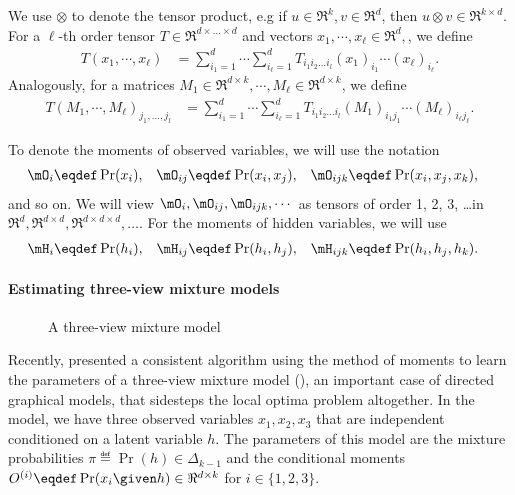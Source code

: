 We use $\otimes$ to denote the tensor product, e.g if $u \in \Re^k,
  v \in \Re^d$, then $u \otimes v \in \Re^{k \times d}$.
For a $\ell$-th order tensor $T \in \Re^{d \times \ldots \times
  d}$ and vectors $x_1, \cdots, x_\ell \in \Re^{d},$, we define 
\begin{align*}
  T(x_1, \cdots, x_\ell) 
      &= \sum_{i_1 = 1}^{d} \cdots \sum_{i_\ell = 1}^{d} 
            T_{i_1 i_2 \ldots i_l} ({x_1})_{i_1} \cdots ({x_\ell})_{i_\ell}.
\end{align*}
Analogously, for a matrices $M_1 \in \Re^{d \times k}, \cdots,
  M_\ell \in \Re^{d \times k}$, we define
\begin{align*}
  T(M_1, \cdots, M_\ell)_{j_1, \ldots, j_l} 
      &= \sum_{i_1 = 1}^{d} \cdots \sum_{i_\ell = 1}^{d} 
            T_{i_1 i_2 \ldots i_l} ({M_1})_{i_1j_1} \cdots ({M_\ell})_{i_\ell j_\ell}.
\end{align*}

To denote the moments of observed variables, we will use the notation
\begin{align*}
  \mO_i &\eqdef \Pr(x_i), &
  \mO_{ij} &\eqdef \Pr(x_i, x_j), &
  \mO_{ijk} &\eqdef \Pr(x_i, x_j, x_k),
\end{align*}
and so on.
We will view $\mO_i, \mO_{ij}, \mO_{ijk}, \cdots$ as tensors of
  order 1, 2, 3, \ldots in $\Re^d, \Re^{d\times d}, \Re^{d \times
  d \times d},\ldots$.
For the moments of hidden variables, we will use 
\begin{align*}
  \mH_i &\eqdef \Pr(h_i), &
  \mH_{ij} &\eqdef \Pr(h_i, h_j), &
  \mH_{ijk} &\eqdef \Pr(h_i, h_j, h_k).
\end{align*}


\paragraph{Estimating three-view mixture models}

\begin{figure}[t]
  \label{fig:three-view}
  \centering
  
  \caption{A three-view mixture model}
\end{figure}

Recently, \citet{anandkumar12moments} presented a consistent algorithm
  using the method of moments to learn the parameters of a three-view
  mixture model (), an important case of directed
  graphical models, that sidesteps the local optima problem altogether. 
In the model, we have three observed variables $x_1, x_2, x_3$
  that are independent conditioned on a latent variable $h$.  
The parameters of this model are the mixture probabilities $\pi \eqdef
  \Pr(h) \in \Delta_{k-1}$ and the conditional moments $O^{(i)} \eqdef
  \Pr(x_i \given h) \in \Re^{d \times k}$ for $i \in \{1,2,3\}$.

